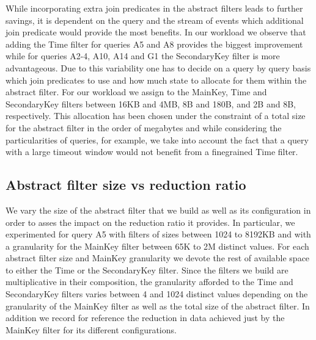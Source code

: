 While incorporating extra join predicates in the abstract filters leads to
further savings, it is dependent on the query and the stream of events which
additional join predicate would provide the most benefits.
In our workload we observe that adding the Time filter for queries A5 and A8 
provides the biggest improvement while for queries A2-4, A10, A14 and G1 the
SecondaryKey filter is more advantageous. 
Due to this variability one has to decide on a query by query basis which join
predicates to use and how much state to allocate for them within the abstract
filter.
For our workload we assign to the MainKey, Time and SecondaryKey filters between
16KB and 4MB, 8B and 180B, and 2B and 8B, respectively.
This allocation has been chosen under the constraint of a total size for the
abstract filter in the order of megabytes and while considering the
particularities of queries, for example, we take into account the fact that a
query with a large timeout window would not benefit from a finegrained Time
filter.





\subsection{Abstract filter size vs reduction ratio}

We vary the size of the abstract filter that we build as well as its
configuration in order to asses the impact on the reduction ratio it provides.
In particular, we experimented for query A5 with filters of sizes between 1024
to 8192KB and with a granularity for the MainKey filter between 65K to 2M
distinct values. For each abstract filter size and MainKey granularity we devote
the rest of available space to either the Time or the SecondaryKey filter.
Since the filters we build are multiplicative in their composition, the
granularity afforded to the Time and SecondaryKey filters varies between 4 and
1024 distinct values depending on the granularity of the MainKey filter as well
as the total size of the abstract filter.
In addition we record for reference the reduction in data achieved just by the
MainKey filter for its different configurations.

